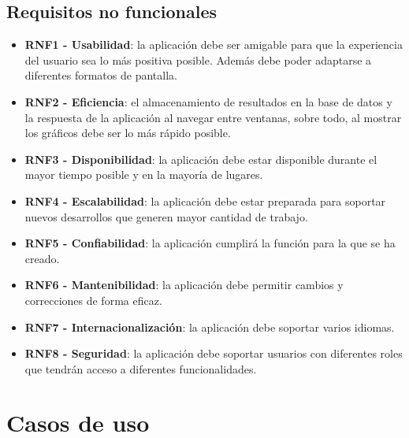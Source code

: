 \subsection{Requisitos no funcionales}
\begin{itemize}
	\item \textbf{RNF1 - Usabilidad}: la aplicación debe ser amigable para que la experiencia del usuario sea lo más positiva posible. Además debe poder adaptarse a diferentes formatos de pantalla. 
	\item \textbf{RNF2 - Eficiencia}: el almacenamiento de resultados en la base de datos y la respuesta de la aplicación al navegar entre ventanas, sobre todo, al mostrar los gráficos debe ser lo más rápido posible. 
	\item \textbf{RNF3 - Disponibilidad}: la aplicación debe estar disponible durante el mayor tiempo posible y en la mayoría de lugares. 
	\item \textbf{RNF4 - Escalabilidad}: la aplicación debe estar preparada para soportar nuevos desarrollos que generen mayor cantidad de trabajo. 
	\item \textbf{RNF5 - Confiabilidad}: la aplicación cumplirá la función para la que se ha creado. 
	\item \textbf{RNF6 - Mantenibilidad}: la aplicación debe permitir cambios y correcciones de forma eficaz.
	\item \textbf{RNF7 - Internacionalización}: la aplicación debe soportar varios idiomas.
	\item \textbf{RNF8 - Seguridad}: la aplicación debe soportar usuarios con diferentes roles que tendrán acceso a diferentes funcionalidades.
	
\end{itemize}


\section{Casos de uso}


